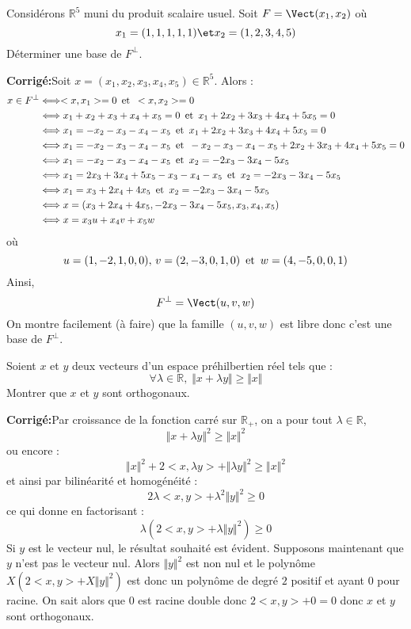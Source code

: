 \documentclass[a4paper,twoside,french,11pt]{VcCours}
\newcommand{\corr}{\textbf{Corrigé:}}
\begin{document}
\begin{Exercice}{} Considérons $\mathbb{R}^5$ muni du produit scalaire usuel. Soit $F= \Vect(x_1,x_2)$ où
$$ x_1 = (1,1,1,1,1) \et x_2 = (1,2,3,4,5)$$
Déterminer une base de $F^{\perp}$.
\end{Exercice} 

\corr Soit $x= (x_1,x_2,x_3,x_4,x_5) \in \mathbb{R}^5$. Alors :
\begin{align*}
x \in F^{\perp} & \Longleftrightarrow <x,x_1>=0 \, \hbox{ et } \,  <x,x_2>=0 \\
& \Longleftrightarrow x_1+x_2+x_3+x_4+x_5=0 \, \hbox{ et } \, x_1+2x_2+3x_3+4x_4+5x_5=0 \\
& \Longleftrightarrow x_1=-x_2-x_3-x_4-x_5 \, \hbox{ et } \, x_1+2x_2+3x_3+4x_4+5x_5=0 \\
& \Longleftrightarrow x_1=-x_2-x_3-x_4-x_5 \, \hbox{ et } \, -x_2-x_3-x_4-x_5+2x_2+3x_3+4x_4+5x_5=0 \\
&  \Longleftrightarrow x_1=-x_2-x_3-x_4-x_5 \, \hbox{ et } \, x_2=-2x_3-3x_4-5x_5 \\
&  \Longleftrightarrow x_1=2x_3+3x_4+5x_5-x_3-x_4-x_5 \, \hbox{ et } \, x_2=-2x_3-3x_4-5x_5 \\
&  \Longleftrightarrow x_1=x_3+2x_4+4x_5 \, \hbox{ et } \, x_2=-2x_3-3x_4-5x_5 \\
& \Longleftrightarrow x= (x_3+2x_4+4x_5, -2x_3-3x_4-5x_5,x_3,x_4,x_5) \\
& \Longleftrightarrow x= x_3 u+x_4 v+ x_5w
\end{align*}
où
$$ u=(1,-2,1,0,0), \, v =(2,-3,0,1,0) \, \hbox{ et } \, w=(4,-5,0,0,1)$$
Ainsi,
$$ F^{\perp} = \Vect(u,v,w)$$
On montre facilement (à faire) que la famille $(u,v,w)$ est libre donc c'est une base de $F^{\perp}$.

\begin{Exercice}{} Soient $x$ et $y$ deux vecteurs d'un espace préhilbertien réel tels que :
$$ \forall \lambda \in \mathbb{R}, \; \Vert x+\lambda y \Vert \geq \Vert x \Vert$$
Montrer que $x$ et $y$ sont orthogonaux.
\end{Exercice}

\corr Par croissance de la fonction carré sur $\mathbb{R}_{+}$, on a pour tout $\lambda \in \mathbb{R}$,
$$ \Vert x+\lambda y \Vert^2 \geq \Vert x \Vert^2$$
ou encore :
$$ \Vert x \Vert^2 + 2  <x,\lambda y> + \Vert \lambda y \Vert^2 \geq \Vert x \Vert^2$$
et ainsi par bilinéarité et homogénéité :
$$ 2 \lambda <x,y> + \lambda^2 \Vert y \Vert^2 \geq 0$$
ce qui donne en factorisant :
$$ \lambda (2<x,y> + \lambda \Vert y \Vert^2) \geq 0$$
Si $y$ est le vecteur nul, le résultat souhaité est évident. Supposons maintenant que $y$ n'est pas le vecteur nul. Alors $\Vert y \Vert^2$ est non nul et le polynôme $X(2<x,y>+ X \Vert y \Vert^2)$ est donc un polynôme de degré $2$ positif et ayant $0$ pour racine. On sait alors que $0$ est racine double donc $2<x,y>+0=0$ donc $x$ et $y$ sont orthogonaux.
\end{document}
